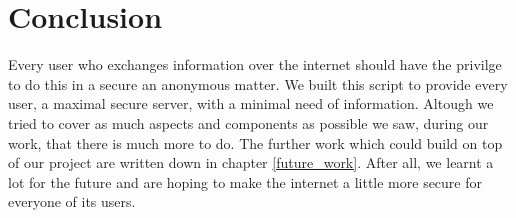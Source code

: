 \chapter{Conclusion}
Every user who exchanges information over the internet should have the privilge to do this in a secure an anonymous matter. We built this script to provide every user, a maximal secure server, with a minimal need of information. Altough we tried to cover as much aspects and components as possible we saw, during our work, that there is much more to do. The further work which could build on top of our project are written down in chapter \ref{future_work}. After all, we learnt a lot for the future and are hoping to make the internet a little more secure for everyone of its users.
